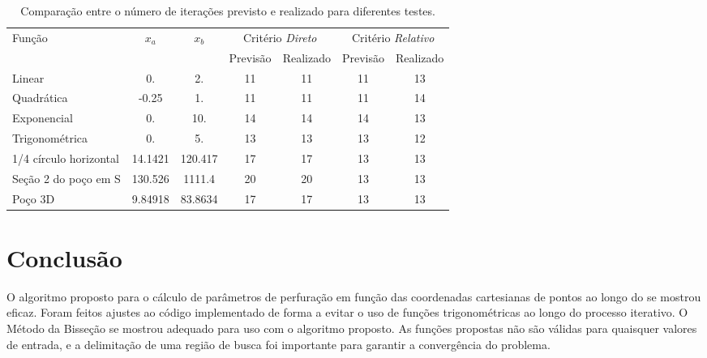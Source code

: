 \documentclass[final,3p,12pt]{elsarticle}
\begin{document}
    \begin{table}[h] \label{table:Iteracoes}
        \centering
        \caption{Comparação entre o número de iterações previsto e realizado para diferentes testes.}
        \begin{tabular}{ l c c c c c c }
            \multirow{2}{*}{Função} & \multirow{2}{*}{$x_a$} & \multirow{2}{*}{$x_b$} & \multicolumn{2}{c}{Critério \emph{Direto}} & \multicolumn{2}{c}{Critério \emph{Relativo}} \\
            &  &  & Previsão & Realizado & Previsão & Realizado \\
            \hline
            Linear & 0. & 2. & 11 & 11 & 11 & 13 \\
            Quadrática & -0.25 & 1. & 11 & 11 & 11 & 14 \\
            Exponencial & 0. & 10. & 14 & 14 & 14 & 13 \\
            Trigonométrica & 0. & 5. & 13 & 13 & 13 & 12 \\
            1/4 círculo horizontal & 14.1421 & 120.417 & 17 & 17 & 13 & 13 \\
            Seção 2 do poço em S & 130.526 & 1111.4 & 20 & 20 & 13 & 13 \\
            Poço 3D & 9.84918 & 83.8634 & 17 & 17 & 13 & 13 \\
        \end{tabular}
    \end{table}
        
    \section{Conclusão}
    
    O algoritmo proposto para o cálculo de parâmetros de perfuração em função das coordenadas cartesianas de pontos ao longo do se mostrou eficaz. Foram feitos ajustes ao código implementado de forma a evitar o uso de funções trigonométricas ao longo do processo iterativo.
    O Método da Bisseção se mostrou adequado para uso com o algoritmo proposto. As funções propostas não são válidas para quaisquer valores de entrada, e a delimitação de uma região de busca foi importante para garantir a convergência do problema.

    

\end{document}
